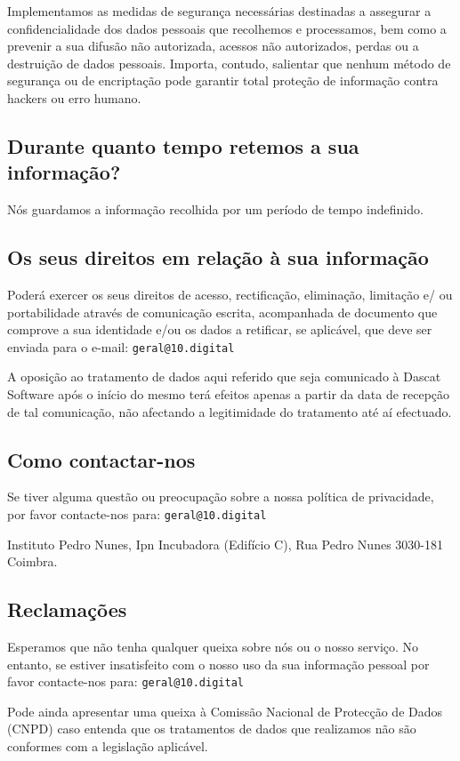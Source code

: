 Implementamos as medidas de segurança necessárias destinadas a assegurar a confidencialidade dos dados pessoais que recolhemos e processamos, bem como a prevenir a sua difusão não autorizada, acessos não autorizados, perdas ou a destruição de dados pessoais. Importa, contudo, salientar que nenhum método de segurança ou de encriptação pode garantir total proteção de informação contra hackers ou erro humano.

\subsection{Durante quanto tempo retemos a sua informação?}

Nós guardamos a informação recolhida por um período de tempo indefinido.

\subsection{Os seus direitos em relação à sua informação}

Poderá exercer os seus direitos de acesso, rectificação, eliminação, limitação e/ ou portabilidade através de comunicação escrita, acompanhada de documento que comprove a sua identidade e/ou os dados a retificar, se aplicável, que deve ser enviada para o e-mail: \texttt{geral@10.digital}

A oposição ao tratamento de dados aqui referido que seja comunicado à Dascat Software após o início do mesmo terá efeitos apenas a partir da data de recepção de tal comunicação, não afectando a legitimidade do tratamento até aí efectuado.

\subsection{Como contactar-nos}

Se tiver alguma questão ou preocupação sobre a nossa política de privacidade, por favor contacte-nos para: \texttt{geral@10.digital}

Instituto Pedro Nunes, Ipn Incubadora (Edifício C), Rua Pedro Nunes 
3030-181 Coimbra.

\subsection{Reclamações}

Esperamos que não tenha qualquer queixa sobre nós ou o nosso serviço. No entanto, se estiver insatisfeito com o nosso uso da sua informação pessoal por favor contacte-nos para: \texttt{geral@10.digital}

Pode ainda apresentar uma queixa à Comissão Nacional de Protecção de Dados (CNPD) caso entenda que os tratamentos de dados que realizamos não são conformes com a legislação aplicável.
